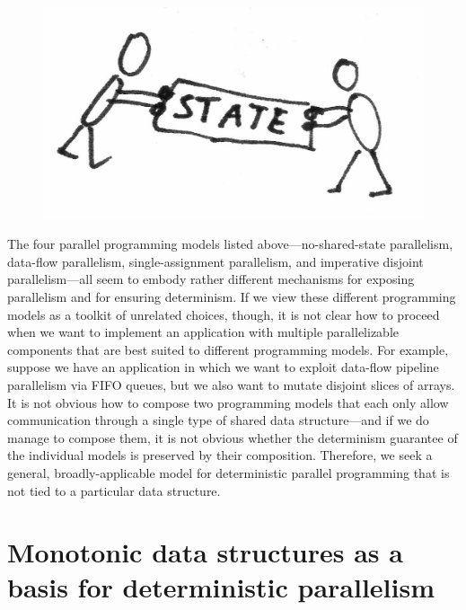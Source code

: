 \ifdefined\DISSERTATION
\begin{figure}
\vspace{-2em}
\begin{center}
  \includegraphics[scale=0.15]{../illustrations/sharing-state}
\end{center}
\vspace{-1.5em}
\end{figure}
\fi
The four parallel programming models listed above---no-shared-state
parallelism, data-flow parallelism, single-assignment parallelism, and
imperative disjoint parallelism---all seem to embody rather different
mechanisms for exposing parallelism and for ensuring determinism.  If
we view these different programming models as a toolkit of unrelated
choices, though, it is not clear how to proceed when we want to
implement an application with multiple parallelizable components that
are best suited to different programming models.  For example, suppose
we have an application in which we want to exploit data-flow pipeline
parallelism via FIFO queues, but we also want to mutate disjoint slices of
arrays.  It is not obvious how to compose two programming models that
each only allow communication through a single type of shared data
structure---and if we do manage to compose them, it is not obvious whether the
determinism guarantee of the individual models is preserved by their
composition.  Therefore, we seek a general, broadly-applicable model
for deterministic parallel programming that is not tied to a
particular data structure.

\section{Monotonic data structures as a basis for deterministic parallelism}\label{s:intro-monotonic}

